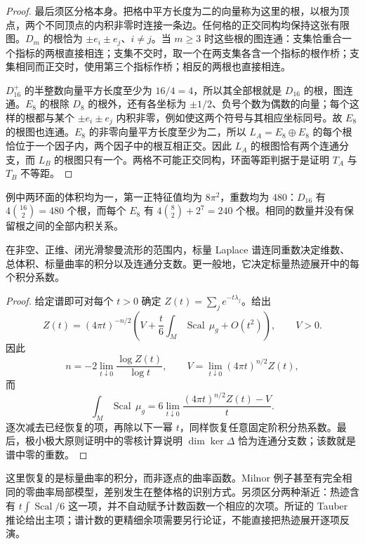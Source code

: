 \begin{proof}
	最后须区分格本身。把格中平方长度为二的向量称为这里的根，以根为顶点，两个不同顶点的内积非零时连接一条边。任何格的正交同构均保持这张有限图。\(D_m\) 的根恰为 \(\pm e_i\pm e_j\)、\(i\ne j\)。当 \(m\ge3\) 时这些根的图连通：支集恰重合一个指标的两根直接相连；支集不交时，取一个在两支集各含一个指标的根作桥；支集相同而正交时，使用第三个指标作桥；相反的两根也直接相连。

	\(D_{16}^+\) 的半整数向量平方长度至少为 \(16/4=4\)，所以其全部根就是 \(D_{16}\) 的根，图连通。\(E_8\) 的根除 \(D_8\) 的根外，还有各坐标为 \(\pm1/2\)、负号个数为偶数的向量；每个这样的根都与某个 \(\pm e_i\pm e_j\) 内积非零，例如使这两个符号与其相应坐标同号。故 \(E_8\) 的根图也连通。\(E_8\) 的非零向量平方长度至少为二，所以 \(L_A=E_8\oplus E_8\) 的每个根恰位于一个因子内，两个因子中的根互相正交。因此 \(L_A\) 的根图恰有两个连通分支，而 \(L_B\) 的根图只有一个。两格不可能正交同构，环面等距判据于是证明 \(T_A\) 与 \(T_B\) 不等距。
\end{proof}

例中两环面的体积均为一，第一正特征值均为 \(8\pi^2\)，重数均为 \(480\)：\(D_{16}\) 有 \(4\binom{16}{2}=480\) 个根，而每个 \(E_8\) 有 \(4\binom82+2^7=240\) 个根。相同的数量并没有保留根之间的全部内积关系。

\begin{proposition}\label{g3:prop:audible-basic-invariants}
	在非空、正维、闭光滑黎曼流形的范围内，标量 Laplace 谱连同重数决定维数、总体积、标量曲率的积分以及连通分支数。更一般地，它决定标量热迹展开中的每个积分系数。
\end{proposition}
\begin{proof}
	给定谱即可对每个 \(t>0\) 确定 \(Z(t)=\sum_je^{-t\lambda_j}\)。给出
	\[
		Z(t)=(4\pi t)^{-n/2}
		\left(V+\frac t6\int_M\operatorname{Scal}\,\mu_g+O(t^2)\right),\qquad V>0.
	\]
	因此
	\[
		n=-2\lim_{t\downarrow0}\frac{\log Z(t)}{\log t},\qquad
		V=\lim_{t\downarrow0}(4\pi t)^{n/2}Z(t),
	\]
	而
	\[
		\int_M\operatorname{Scal}\,\mu_g
		=6\lim_{t\downarrow0}\frac{(4\pi t)^{n/2}Z(t)-V}{t}.
	\]
	逐次减去已经恢复的项，再除以下一幂 \(t\)，同样恢复任意固定阶积分热系数。最后，极小极大原则证明中的零核计算说明 \(\dim\ker\Delta\) 恰为连通分支数；该数就是谱中零的重数。
\end{proof}

这里恢复的是标量曲率的积分，而非逐点的曲率函数。Milnor 例子甚至有完全相同的零曲率局部模型，差别发生在整体格的识别方式。另须区分两种渐近：热迹含有 \(t\int\operatorname{Scal}/6\) 这一项，并不自动赋予计数函数一个相应的次项。所证的 Tauber 推论给出主项；谱计数的更精细余项需要另行论证，不能直接把热迹展开逐项反演。
